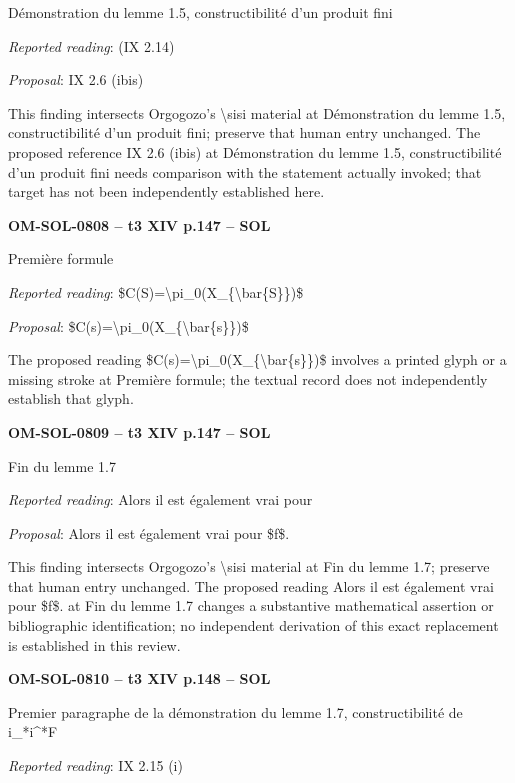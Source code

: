 Démonstration du lemme 1.5, constructibilité d'un produit fini\par
\emph{Reported reading}: (IX 2.14)\par
\emph{Proposal}: IX 2.6 (ibis)\par
This finding intersects Orgogozo's \textbackslash{}sisi material at Démonstration du lemme 1.5, constructibilité d'un produit fini; preserve that human entry unchanged. The proposed reference IX 2.6 (ibis) at Démonstration du lemme 1.5, constructibilité d'un produit fini needs comparison with the statement actually invoked; that target has not been independently established here.\par
\par\noindent\textbf{OM-SOL-0808 -- t3 XIV p.147 -- SOL}\par
Première formule\par
\emph{Reported reading}: \$C(S)=\allowbreak \textbackslash{}pi\_0(X\_\{\textbackslash{}bar\{S\}\})\$\par
\emph{Proposal}: \$C(s)=\allowbreak \textbackslash{}pi\_0(X\_\{\textbackslash{}bar\{s\}\})\$\par
The proposed reading \$C(s)=\allowbreak \textbackslash{}pi\_0(X\_\{\textbackslash{}bar\{s\}\})\$ involves a printed glyph or a missing stroke at Première formule; the textual record does not independently establish that glyph.\par
\par\noindent\textbf{OM-SOL-0809 -- t3 XIV p.147 -- SOL}\par
Fin du lemme 1.7\par
\emph{Reported reading}: Alors il est également vrai pour\par
\emph{Proposal}: Alors il est également vrai pour \$f\$.\par
This finding intersects Orgogozo's \textbackslash{}sisi material at Fin du lemme 1.7; preserve that human entry unchanged. The proposed reading Alors il est également vrai pour \$f\$. at Fin du lemme 1.7 changes a substantive mathematical assertion or bibliographic identification; no independent derivation of this exact replacement is established in this review.\par
\par\noindent\textbf{OM-SOL-0810 -- t3 XIV p.148 -- SOL}\par
Premier paragraphe de la démonstration du lemme 1.7, constructibilité de i\_*i\textasciicircum{}*F\par
\emph{Reported reading}: IX 2.15 (i)\par

